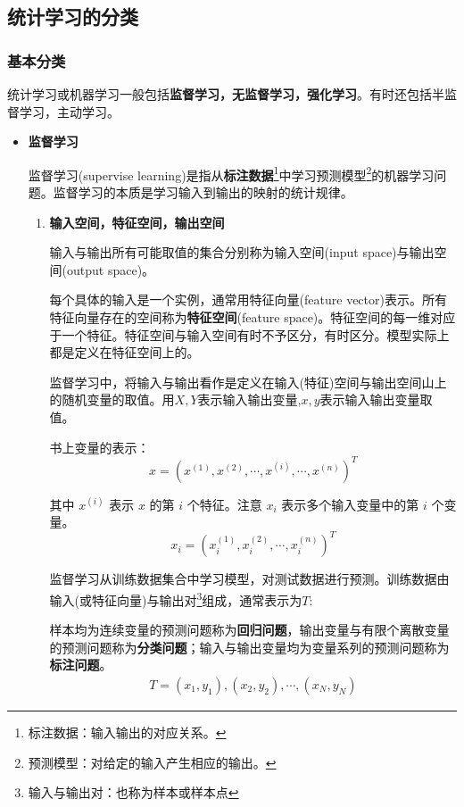 \subsection{统计学习的分类}
\subsubsection{基本分类}

统计学习或机器学习一般包括\textbf{监督学习，无监督学习，强化学习}。有时还包括半监督学习，主动学习。
\begin{itemize}
    \item \textbf{监督学习 }

    监督学习(supervise learning)是指从\textbf{标注数据}\footnote{标注数据：输入输出的对应关系。}中学习预测模型\footnote{预测模型：对给定的输入产生相应的输出。}的机器学习问题。监督学习的本质是学习输入到输出的映射的统计规律。

    \begin{enumerate}
        \item \textbf{输入空间，特征空间，输出空间 }
        
        输入与输出所有可能取值的集合分别称为输入空间(input space)与输出空间(output space)。

        每个具体的输入是一个实例，通常用特征向量(feature vector)表示。所有特征向量存在的空间称为\textbf{特征空间}(feature space)。特征空间的每一维对应于一个特征。特征空间与输入空间有时不予区分，有时区分。模型实际上都是定义在特征空间上的。

        监督学习中，将输入与输出看作是定义在输入(特征)空间与输出空间山上的随机变量的取值。用$X,Y$表示输入输出变量,$x,y$表示输入输出变量取值。

        书上变量的表示：
        \begin{equation}
            x= \left( x^{(1)},x^{(2)},\cdots ,x^{(i)}, \cdots , x^{(n)} \right)^T
        \end{equation}

        其中 $x^{(i)}$ 表示 $x$ 的第 $i$ 个特征。注意 $x_i$ 表示多个输入变量中的第 $i$ 个变量。
        \begin{equation}
            x_i = \left( x_i^{(1)},x_i^{(2)},\cdots,x_i^{(n)} \right)^T
        \end{equation}

        监督学习从训练数据集合中学习模型，对测试数据进行预测。训练数据由输入(或特征向量)与输出对\footnote{输入与输出对：也称为样本或样本点}组成，通常表示为$T$:

        样本均为连续变量的预测问题称为\textbf{回归问题}，输出变量与有限个离散变量的预测问题称为\textbf{分类问题}；输入与输出变量均为变量系列的预测问题称为\textbf{标注问题}。
        \begin{eqnarray}
            T={(x_1,y_1),(x_2,y_2),\cdots,(x_N,y_N)}
        \end{eqnarray}


\end{enumerate}
\end{itemize}
